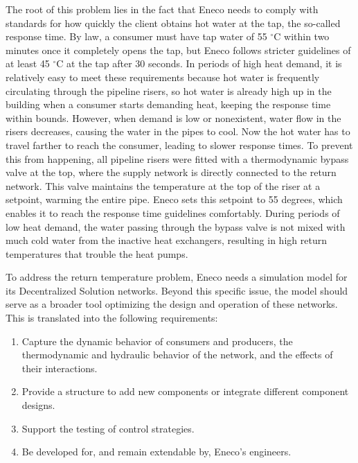 The root of this problem lies in the fact that Eneco needs to comply with standards for how quickly the client obtains hot water at the tap, the so-called response time. By law, a consumer must have tap water of 55 $^{\circ}\text{C}$ within two minutes once it completely opens the tap, but Eneco follows stricter guidelines of at least 45 $^{\circ}\text{C}$ at the tap after 30 seconds. In periods of high heat demand, it is relatively easy to meet these requirements because hot water is frequently circulating through the pipeline risers, so hot water is already high up in the building when a consumer starts demanding heat, keeping the response time within bounds. However, when demand is low or nonexistent, water flow in the risers decreases, causing the water in the pipes to cool. Now the hot water has to travel farther to reach the consumer, leading to slower response times. To prevent this from happening, all pipeline risers were fitted with a thermodynamic bypass valve at the top, where the supply network is directly connected to the return network. This valve maintains the temperature at the top of the riser at a setpoint, warming the entire pipe. Eneco sets this setpoint to 55 degrees, which enables it to reach the response time guidelines comfortably. During periods of low heat demand, the water passing through the bypass valve is not mixed with much cold water from the inactive heat exchangers, resulting in high return temperatures that trouble the heat pumps. 

To address the return temperature problem, Eneco needs a simulation model for its Decentralized Solution networks. Beyond this specific issue, the model should serve as a broader tool optimizing the design and operation of these networks. 
This is translated into the following requirements: 

\begin{enumerate}
    \item Capture the dynamic behavior of consumers and producers, the thermodynamic and hydraulic behavior of the network, and the effects of their interactions.
    \item Provide a structure to add new components or integrate different component designs.
    \item Support the testing of control strategies.
    \item Be developed for, and remain extendable by, Eneco's engineers. 
\end{enumerate}

